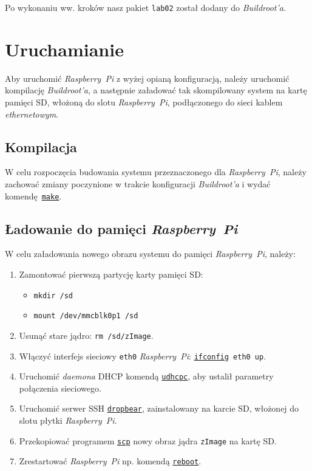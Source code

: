\documentclass{article}
\begin{document}
Po wykonaniu ww. kroków nasz pakiet \texttt{lab02} został dodany do \emph{Buildroot'a}.


\section{Uruchamianie}

Aby uruchomić \emph{Raspberry~Pi} z wyżej opianą konfiguracją, należy uruchomić kompilację \emph{Buildroot'a}, a następnie załadować tak skompilowany system na kartę pamięci SD, włożoną do slotu \emph{Raspberry~Pi}, podłączonego do sieci kablem \emph{ethernetowym}.

\subsection{Kompilacja}

W celu rozpoczęcia budowania systemu przeznaczonego dla \emph{Raspberry~Pi}, należy zachować zmiany poczynione w trakcie konfiguracji \emph{Buildroot'a} i wydać komendę~\texttt{\href{https://github.com/buildroot/buildroot/blob/master/Makefile}{make}}.


\subsection{Ładowanie do pamięci \emph{Raspberry~Pi}}

W celu załadowania nowego obrazu systemu do pamięci \emph{Raspberry~Pi}, należy:
\begin{enumerate}
\item Zamontować pierwszą partycję karty pamięci SD:
\begin{itemize}
\item \texttt{mkdir /sd}
\item \texttt{mount /dev/mmcblk0p1 /sd}
\end{itemize}
\item Usunąć stare jądro: \texttt{rm /sd/zImage}.
\item Włączyć interfejs sieciowy \texttt{eth0} \emph{Raspberry~Pi}: \texttt{\href{http://linux.die.net/man/8/ifconfig}{ifconfig} eth0 up}.
\item Uruchomić \emph{daemona} DHCP komendą \texttt{\href{http://dev.man-online.org/man8/udhcpc/}{udhcpc}}, aby ustalił parametry połączenia sieciowego.
\item Uruchomić serwer SSH \texttt{\href{https://matt.ucc.asn.au/dropbear/dropbear.html}{dropbear}}, zainstalowany na karcie SD, włożonej do slotu płytki \emph{Raspberry~Pi}.
\item Przekopiować programem \texttt{\href{http://linux.die.net/man/1/scp}{scp}} nowy obraz jądra \texttt{zImage} na kartę SD.
\item Zrestartować \emph{Raspberry~Pi} np. komendą \texttt{\href{http://linux.die.net/man/8/reboot}{reboot}}.
\end{enumerate}
\end{document}
